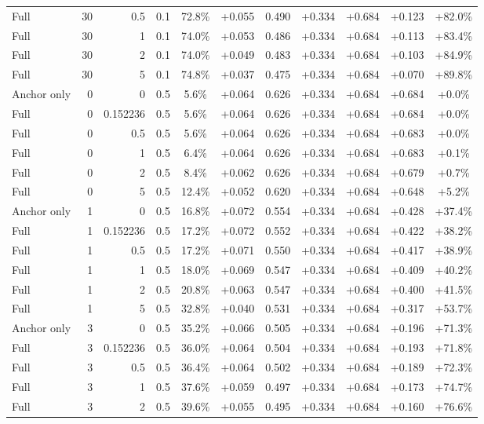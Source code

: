 \begin{table}[htbp]
\begin{tabular}{lrrrccccccc}
Full & 30 & 0.5 & 0.1 & 72.8\% & +0.055 & 0.490 & +0.334 & +0.684 & +0.123 & +82.0\% \\
Full & 30 & 1 & 0.1 & 74.0\% & +0.053 & 0.486 & +0.334 & +0.684 & +0.113 & +83.4\% \\
Full & 30 & 2 & 0.1 & 74.0\% & +0.049 & 0.483 & +0.334 & +0.684 & +0.103 & +84.9\% \\
Full & 30 & 5 & 0.1 & 74.8\% & +0.037 & 0.475 & +0.334 & +0.684 & +0.070 & +89.8\% \\
Anchor only & 0 & 0 & 0.5 & 5.6\% & +0.064 & 0.626 & +0.334 & +0.684 & +0.684 & +0.0\% \\
Full & 0 & 0.152236 & 0.5 & 5.6\% & +0.064 & 0.626 & +0.334 & +0.684 & +0.684 & +0.0\% \\
Full & 0 & 0.5 & 0.5 & 5.6\% & +0.064 & 0.626 & +0.334 & +0.684 & +0.683 & +0.0\% \\
Full & 0 & 1 & 0.5 & 6.4\% & +0.064 & 0.626 & +0.334 & +0.684 & +0.683 & +0.1\% \\
Full & 0 & 2 & 0.5 & 8.4\% & +0.062 & 0.626 & +0.334 & +0.684 & +0.679 & +0.7\% \\
Full & 0 & 5 & 0.5 & 12.4\% & +0.052 & 0.620 & +0.334 & +0.684 & +0.648 & +5.2\% \\
Anchor only & 1 & 0 & 0.5 & 16.8\% & +0.072 & 0.554 & +0.334 & +0.684 & +0.428 & +37.4\% \\
Full & 1 & 0.152236 & 0.5 & 17.2\% & +0.072 & 0.552 & +0.334 & +0.684 & +0.422 & +38.2\% \\
Full & 1 & 0.5 & 0.5 & 17.2\% & +0.071 & 0.550 & +0.334 & +0.684 & +0.417 & +38.9\% \\
Full & 1 & 1 & 0.5 & 18.0\% & +0.069 & 0.547 & +0.334 & +0.684 & +0.409 & +40.2\% \\
Full & 1 & 2 & 0.5 & 20.8\% & +0.063 & 0.547 & +0.334 & +0.684 & +0.400 & +41.5\% \\
Full & 1 & 5 & 0.5 & 32.8\% & +0.040 & 0.531 & +0.334 & +0.684 & +0.317 & +53.7\% \\
Anchor only & 3 & 0 & 0.5 & 35.2\% & +0.066 & 0.505 & +0.334 & +0.684 & +0.196 & +71.3\% \\
Full & 3 & 0.152236 & 0.5 & 36.0\% & +0.064 & 0.504 & +0.334 & +0.684 & +0.193 & +71.8\% \\
Full & 3 & 0.5 & 0.5 & 36.4\% & +0.064 & 0.502 & +0.334 & +0.684 & +0.189 & +72.3\% \\
Full & 3 & 1 & 0.5 & 37.6\% & +0.059 & 0.497 & +0.334 & +0.684 & +0.173 & +74.7\% \\
Full & 3 & 2 & 0.5 & 39.6\% & +0.055 & 0.495 & +0.334 & +0.684 & +0.160 & +76.6\% \\

\end{tabular}
\end{table}
